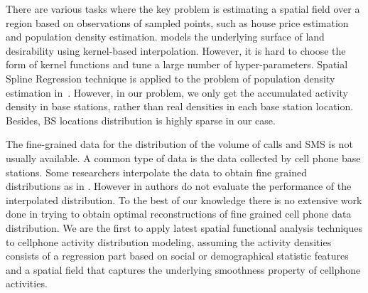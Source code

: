 There are various tasks where the key problem is estimating a spatial field over a region based on observations of sampled points, such as house price estimation and population density estimation. \cite{chopra2007discovering} models the underlying surface of land desirability using kernel-based interpolation. However, it is hard to choose the form of kernel functions and tune a large number of hyper-parameters. 
Spatial Spline Regression technique is applied to the problem of population density estimation in~\cite{Sanga13}. However, in our problem, we only get the accumulated activity density in base stations, rather than real densities in each base station location. Besides, BS locations distribution is highly sparse in our case. 




The fine-grained data for the distribution of the volume of calls and SMS is not usually available. A common type of data is the data collected by cell phone base stations.
Some researchers interpolate the data to obtain fine grained distributions as in \cite{ratti2006mobile}. However in \cite{ratti2006mobile} authors do not evaluate the performance of the interpolated distribution. To the best of our knowledge 
there is no extensive work done in trying to obtain optimal reconstructions of fine grained cell phone data distribution. 
We are the first to apply latest spatial functional analysis techniques to cellphone activity distribution modeling, assuming the activity densities consists of a regression part based on social or demographical statistic features and a spatial field that captures the underlying smoothness property of cellphone activities. 
